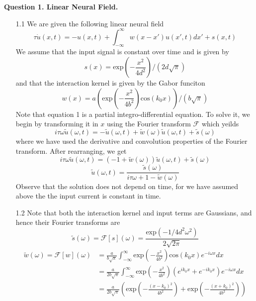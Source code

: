 \documentclass[12pt]{article}
\begin{document}
\noindent


\noindent\textbf{Question 1. Linear Neural Field.}
\begin{enumerate}
\item[1.1] We are given the following linear neural field
\begin{equation}
    \tau \dot{u}(x, t) =   -u(x, t) + \int_{-\infty}^{\infty}w(x-x')u(x', t)dx' + s(x, t)
\end{equation}
We assume that the input signal is constant over time and is given by 
\begin{equation}
    s(x) = \text{exp}\left(-\frac{x^2}{4d^2}\right)/(2d\sqrt{\pi})
\end{equation}
and that the interaction kernel is given by the Gabor funciton
\begin{equation}
    w(x) = a\left(\text{exp}\left(-\frac{x^2}{4b^2}\right)\text{cos}(k_{0}x)\right)/(b\sqrt{\pi})
\end{equation}
Note that equation 1 is a partial integro-differential equation. To solve it, we begin by transforming it in $x$ 
using the Fourier transform $\mathcal{F}$ which yeilds
\[
    i \tau \omega \widetilde{u}(\omega, t) = -\widetilde{u}(\omega, t) + \widetilde{w}(\omega)\widetilde{u}(\omega, t) + \widetilde{s}(\omega)
\]
where we have used the derivative and convolution properties of the Fourier transform. After rearranging, we get
\[
    i\tau \omega \widetilde{u}(\omega, t) = (-1 + \widetilde{w}(\omega))\widetilde{u}(\omega, t) + \widetilde{s}(\omega)
\]
\[
    \widetilde{u}(\omega, t) = \frac{\widetilde{s}(\omega)}{i\tau \omega + 1 - \widetilde{w}(\omega)}
\]
Observe that the solution does not depend on time, for we have assumed above the the input current is constant in time.
\item[1.2] Note that both the interaction kernel and input terms are Gaussians, and hence their Fourier transforms are 
\[
    \widetilde{s}(\omega) = \mathcal{F}[s](\omega) =  \frac{\text{exp}(-1/4d^{2}\omega^{2})}{2\sqrt{2\pi}}
\]
\begin{align*}
    \widetilde{w}(\omega) = \mathcal{F}[w](\omega) &= \frac{a}{b\sqrt{\pi}}\int_{-\infty}^{\infty}\text{exp}\left(-\frac{x^2}{4b^{2}}\right)\text{cos}(k_{0}x)e^{-i\omega x}dx\\
                           &= \frac{a}{2b\sqrt{\pi}}\int_{-\infty}^{\infty}\text{exp}\left(-\frac{x^2}{4b^{2}}\right)(e^{ik_{0}x}+e^{-ik_{0}x})e^{-i\omega x}dx\\
                           &= \frac{a}{2b\sqrt{\pi}}\left( \text{exp}\left(-\frac{(x-k_{0})^2}{4b^{2}}\right) + \text{exp}\left(-\frac{(x+k_{0})^2}{4b^{2}}\right)\right)

\end{align*}
\end{enumerate}
\end{document}
